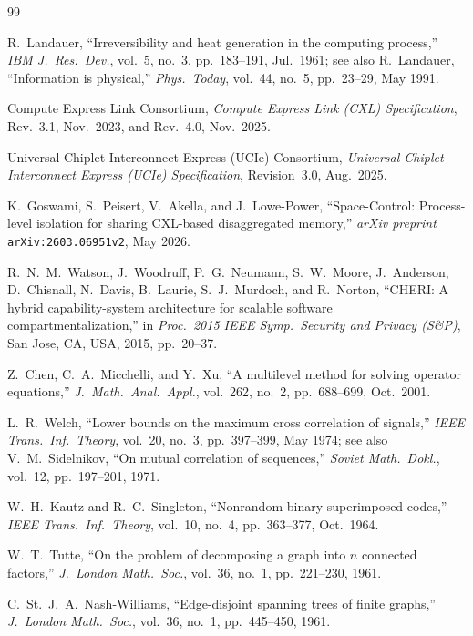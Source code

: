 \documentclass[10pt,twocolumn]{article}
\theoremstyle{spectralthm}
\begin{document}
\begin{thebibliography}{99}
\footnotesize

R.~Landauer, ``Irreversibility and heat generation in the computing process,'' \textit{IBM J.\ Res.\ Dev.}, vol.~5, no.~3, pp.~183--191, Jul.\ 1961; see also R.~Landauer, ``Information is physical,'' \textit{Phys.\ Today}, vol.~44, no.~5, pp.~23--29, May 1991.

Compute Express Link Consortium, \textit{Compute Express Link (CXL) Specification}, Rev.~3.1, Nov.\ 2023, and Rev.~4.0, Nov.\ 2025.

Universal Chiplet Interconnect Express (UCIe) Consortium, \textit{Universal Chiplet Interconnect Express (UCIe) Specification}, Revision~3.0, Aug.\ 2025.

K.~Goswami, S.~Peisert, V.~Akella, and J.~Lowe-Power, ``Space-Control: Process-level isolation for sharing CXL-based disaggregated memory,'' \textit{arXiv preprint} \texttt{arXiv:2603.06951v2}, May 2026.

R.~N.~M.~Watson, J.~Woodruff, P.~G.~Neumann, S.~W.~Moore, J.~Anderson, D.~Chisnall, N.~Davis, B.~Laurie, S.~J.~Murdoch, and R.~Norton, ``CHERI: A hybrid capability-system architecture for scalable software compartmentalization,'' in \textit{Proc.\ 2015 IEEE Symp.\ Security and Privacy (S\&P)}, San Jose, CA, USA, 2015, pp.~20--37.

Z.~Chen, C.~A.~Micchelli, and Y.~Xu, ``A multilevel method for solving operator equations,'' \textit{J.\ Math.\ Anal.\ Appl.}, vol.~262, no.~2, pp.~688--699, Oct.\ 2001.

L.~R.~Welch, ``Lower bounds on the maximum cross correlation of signals,'' \textit{IEEE Trans.\ Inf.\ Theory}, vol.~20, no.~3, pp.~397--399, May 1974; see also V.~M.~Sidelnikov, ``On mutual correlation of sequences,'' \textit{Soviet Math.\ Dokl.}, vol.~12, pp.~197--201, 1971.

W.~H.~Kautz and R.~C.~Singleton, ``Nonrandom binary superimposed codes,'' \textit{IEEE Trans.\ Inf.\ Theory}, vol.~10, no.~4, pp.~363--377, Oct.\ 1964.

W.~T.~Tutte, ``On the problem of decomposing a graph into $n$ connected factors,'' \textit{J.\ London Math.\ Soc.}, vol.~36, no.~1, pp.~221--230, 1961.

C.~St.~J.~A.~Nash-Williams, ``Edge-disjoint spanning trees of finite graphs,'' \textit{J.\ London Math.\ Soc.}, vol.~36, no.~1, pp.~445--450, 1961.


\end{thebibliography}
\end{document}
